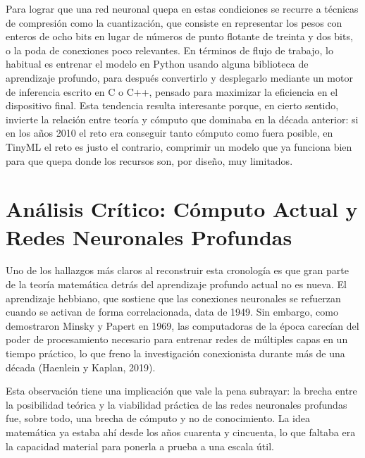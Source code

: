 \documentclass[12pt,letterpaper]{article}
\begin{document}
Para lograr que una red neuronal quepa en estas condiciones se recurre a t\'ecnicas de compresi\'on como la cuantizaci\'on, que consiste en representar los pesos con enteros de ocho bits en lugar de n\'umeros de punto flotante de treinta y dos bits, o la poda de conexiones poco relevantes. En t\'erminos de flujo de trabajo, lo habitual es entrenar el modelo en Python usando alguna biblioteca de aprendizaje profundo, para despu\'es convertirlo y desplegarlo mediante un motor de inferencia escrito en C o C++, pensado para maximizar la eficiencia en el dispositivo final. Esta tendencia resulta interesante porque, en cierto sentido, invierte la relaci\'on entre teor\'ia y c\'omputo que dominaba en la d\'ecada anterior: si en los a\~nos 2010 el reto era conseguir tanto c\'omputo como fuera posible, en TinyML el reto es justo el contrario, comprimir un modelo que ya funciona bien para que quepa donde los recursos son, por dise\~no, muy limitados.

\section{An\'alisis Cr\'itico: C\'omputo Actual y Redes Neuronales Profundas}

Uno de los hallazgos m\'as claros al reconstruir esta cronolog\'ia es que gran parte de la teor\'ia matem\'atica detr\'as del aprendizaje profundo actual no es nueva. El aprendizaje hebbiano, que sostiene que las conexiones neuronales se refuerzan cuando se activan de forma correlacionada, data de 1949. Sin embargo, como demostraron Minsky y Papert en 1969, las computadoras de la \'epoca carec\'ian del poder de procesamiento necesario para entrenar redes de m\'ultiples capas en un tiempo pr\'actico, lo que freno la investigaci\'on conexionista durante m\'as de una d\'ecada (Haenlein y Kaplan, 2019).

Esta observaci\'on tiene una implicaci\'on que vale la pena subrayar: la brecha entre la posibilidad te\'orica y la viabilidad pr\'actica de las redes neuronales profundas fue, sobre todo, una brecha de c\'omputo y no de conocimiento. La idea matem\'atica ya estaba ah\'i desde los a\~nos cuarenta y cincuenta, lo que faltaba era la capacidad material para ponerla a prueba a una escala \'util.
\end{document}

